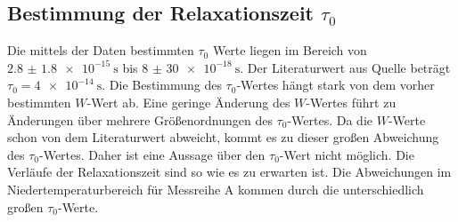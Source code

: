 \subsection{Bestimmung der Relaxationszeit \texorpdfstring{$\tau_{0}$}{T1}}
Die mittels der Daten bestimmten $\tau_0$ Werte liegen im Bereich von $\SI{2.8(18)e-15}{\second}$ bis $\SI{8(30)e-18}{\second}$.
Der Literaturwert aus Quelle \cite{Muccillo} beträgt $\tau_0=\SI{4e-14}{\second}$. Die Bestimmung des $\tau_0$-Wertes 
hängt stark von dem vorher bestimmten $W$-Wert ab. Eine geringe Änderung des $W$-Wertes führt zu Änderungen über 
mehrere Größenordnungen des $\tau_0$-Wertes. Da die $W$-Werte schon von dem Literaturwert abweicht, kommt es zu 
dieser großen Abweichung des $\tau_0$-Wertes. Daher ist eine Aussage über den $\tau_0$-Wert nicht möglich.
Die Verläufe der Relaxationszeit sind so wie es zu erwarten ist. Die Abweichungen im Niedertemperaturbereich für 
Messreihe A kommen durch die unterschiedlich großen $\tau_0$-Werte.


